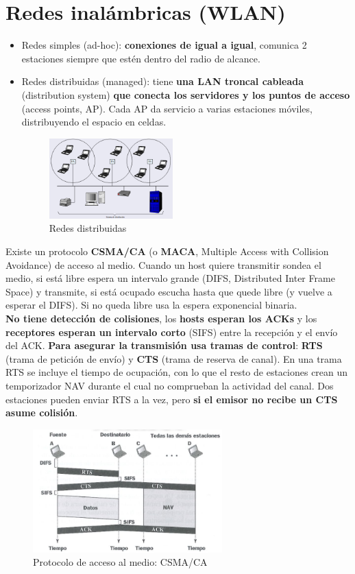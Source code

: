 \documentclass{article}
\begin{document}
\newpage

\section{Redes inalámbricas (WLAN)}
\begin{itemize}
    \item Redes simples (ad-hoc): \textbf{conexiones de igual a igual}, comunica 2 estaciones siempre que estén dentro del radio de alcance.
    
    \item Redes distribuidas (managed): tiene \textbf{una LAN troncal cableada} (distribution system) \textbf{que conecta los servidores y los puntos de acceso} (access points, AP). Cada AP da servicio a varias estaciones móviles, distribuyendo el espacio en celdas.
        \begin{figure}[h]
        \centering
        \includegraphics[width=0.45\textwidth]{img-t5/img_436_39.png}
        \caption{Redes distribuidas}
        \end{figure}    
\end{itemize}

Existe un protocolo \textbf{CSMA/CA} (o \textbf{MACA}, Multiple Access with Collision Avoidance) de acceso al medio. Cuando un host quiere transmitir sondea el medio, si está libre espera un intervalo grande (DIFS, Distributed Inter Frame Space) y transmite, si está ocupado escucha hasta que quede libre (y vuelve a esperar el DIFS). Si no queda libre usa la espera exponencial binaria. \\
\textbf{No tiene detección de colisiones}, los \textbf{hosts esperan los ACKs} y los \textbf{receptores esperan un intervalo corto} (SIFS) entre la recepción y el envío del ACK. \textbf{Para asegurar la transmisión usa tramas de control}: \textbf{RTS} (trama de petición de envío) y \textbf{CTS} (trama de reserva de canal). En una trama RTS se incluye el tiempo de ocupación, con lo que el resto de estaciones crean un temporizador NAV durante el cual no comprueban la actividad del canal. Dos estaciones pueden enviar RTS a la vez, pero \textbf{si el emisor no recibe un CTS asume colisión}.

\begin{figure}[h]
    \centering
    \includegraphics[width=0.65\textwidth]{img-t5/img_369_04.png}
    \caption{Protocolo de acceso al medio: CSMA/CA}
\end{figure}
\end{document}
